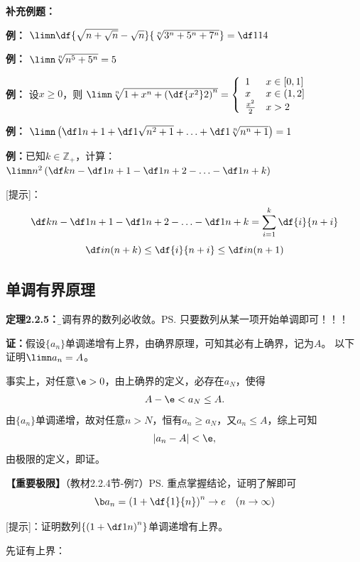 {\bf 补充例题：}

{\bf 例：} $\limn\df{\sqrt{n+\sqrt n}-\sqrt n}{\sqrt[n]{3^n+5^n+7^n}}=\df1{14}$


{\bf 例：} $\limn\sqrt[n]{n^5+5^n}=5$

{\bf 例：} 设$x\geq 0$，则
$\limn\sqrt[n]{1+x^n+\left(\df{x^2}2\right)^n}=
\left\{\begin{array}{ll}
1&x\in[0,1]\\ x & x\in(1,2]\\ \frac{x^2}2& x>2
\end{array}\right.$

{\bf 例：} $\limn\left(\df1{n+1}+\df1{\sqrt{n^2+1}}+\ldots
+\df1{\sqrt[n]{n^n+1}}\right)=1$

{\bf 例：}已知$k\in\mathbb{Z}_+$，计算：$\limn n^2\left(\df kn-\df1{n+1}-\df1{n+2}
-\ldots-\df1{n+k}\right)$

[提示]：
$$\df kn-\df1{n+1}-\df1{n+2}-\ldots-\df1{n+k}=\sum\limits_{i=1}^k\df{i}{n+i}$$
$$\df i{n(n+k)}\leq\df{i}{n+i}\leq\df i{n(n+1)}$$

\subsection{单调有界原理}

{\bf 定理2.2.5：}{\b 单调有界的数列必收敛。}\ps{只要数列从某一项开始单调即可！！！}

{\bf 证：}假设$\{a_n\}$单调递增有上界，由确界原理，可知其必有上确界，记为$A$。
以下证明$\limn a_n=A$。

事实上，对任意$\e>0$，由上确界的定义，必存在$a_N$，使得
$$A-\e<a_N\leq A.$$
由$\{a_n\}$单调递增，故对任意$n>N$，恒有$a_n\geq a_N$，又$a_n\leq A$，综上可知
$$|a_n-A|<\e,$$
由极限的定义，即证。


{\bf 【重要极限】}（教材2.2.4节-例7）\ps{重点掌握结论，证明了解即可}
$${\b a_n=\left(1+\df{1}{n}\right)^n\to e\quad (n\to\infty)}$$

[提示]：证明数列$\left\{\left(1+\df1n\right)^n\right\}$单调递增有上界。

先证有上界：

